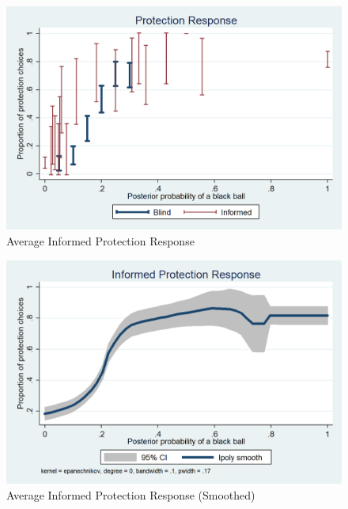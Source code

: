 \documentclass[11pt,a4paper]{article}
\begin{document}
\begin{figure}[H]
\centering
\caption{Average Informed Protection Response} \label{Informed Protection Responses}

  \centering
  \includegraphics[scale=0.3]{Graphs/ip_response_comp.png}

\end{figure}


\begin{figure}[H]
\centering
\caption{Average Informed Protection Response (Smoothed)} \label{Informed Protection Responses}

  \centering
  \includegraphics[scale=0.3]{Graphs/ip_response_lpoly.png}

\end{figure}
\end{document}
